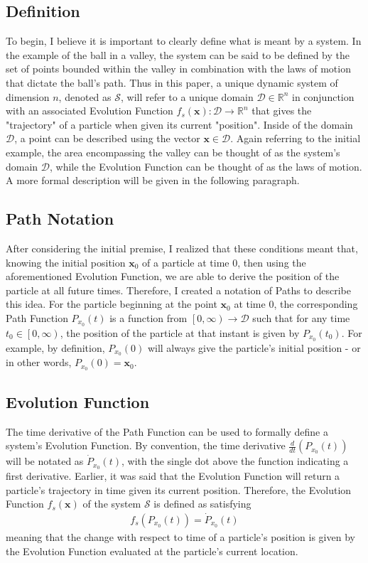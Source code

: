 \documentclass{article}
\newcommand{\B}[1]{\boldsymbol{#1}}
\theoremstyle{definition}
\theoremstyle{remark}
\begin{document}
\subsection{Definition}
  To begin, I believe it is important to clearly define what is meant by a system. In the example of 
the ball in a valley, the system can be said to be defined by the set of points bounded within the valley
in combination with the laws of motion that dictate the ball's path. Thus in this paper, 
a unique dynamic system of dimension $n$, denoted as $\mathcal{S}$,
will refer to a unique domain $\mathcal{D} \in \mathbb{R}^n$ in conjunction with an associated 
Evolution Function $f_s(\B{x}) : \mathcal{D} \to \mathbb{R}^n$ that gives the "trajectory" of a particle 
when given its current "position". Inside of the domain $\mathcal{D}$, a point can be described using the vector $\B{x} \in \mathcal{D}$. 
Again referring to the initial example, the area encompassing the valley
can be thought of as the system's domain $\mathcal{D}$, while the Evolution Function can be thought of as the
laws of motion. A more formal description will be given in the following paragraph. 

\subsection{Path Notation}

After considering the initial premise, I realized that these conditions meant that, knowing 
the initial position $\B{x}_0$ of a particle at time 0, then using the aforementioned Evolution Function,
we are able to derive the position of the particle at all future times. Therefore, I created a notation 
of Paths to describe this idea. For the particle beginning at the point $\B{x}_0$ at time 0, the corresponding 
Path Function $P_{x_0}(t)$ is a function from $\left[0, \infty \right) \to \mathcal{D}$ such that for any time 
$t_0 \in \left[0, \infty \right)$, the position of the particle at that instant is given by $P_{x_0}(t_0)$. For example,
by definition, $P_{x_0}(0)$ will always give the particle's initial position - or in other words, $P_{x_0}(0) = \B{x}_0$.

\subsection{Evolution Function}

The time derivative of the Path Function can be used to formally define a system's Evolution Function. 
By convention, the time derivative $\frac{d}{dt} \left(P_{x_0}(t)\right)$ will be notated as $\dot{P}_{x_0}(t)$, 
with the single dot above the function indicating a first derivative. Earlier, it was said that
the Evolution Function will return a particle's trajectory in time given its current position. Therefore,
the Evolution Function $f_s(\B{x})$ of the system $\mathcal{S}$ is defined as satisfying 
\begin{align}
  f_s(P_{x_0}(t)) = \dot{P}_{x_0}(t) \label{eq:System Equation} 
\end{align}
meaning that the change with respect to time of a particle's position is given by the Evolution Function evaluated at the 
particle's current location.
\end{document}
